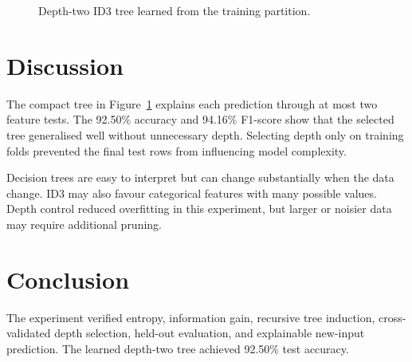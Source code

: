 \documentclass[12pt,a4paper]{report}
\begin{document}
\begin{figure}[H]\centering
{}
\caption{Depth-two ID3 tree learned from the training partition.}
\label{fig:tree}
\end{figure}

\section{Discussion}
The compact tree in Figure~\ref{fig:tree} explains each prediction through at most two feature tests. The 92.50\% accuracy and 94.16\% F1-score show that the selected tree generalised well without unnecessary depth. Selecting depth only on training folds prevented the final test rows from influencing model complexity.

Decision trees are easy to interpret but can change substantially when the data change. ID3 may also favour categorical features with many possible values. Depth control reduced overfitting in this experiment, but larger or noisier data may require additional pruning.

\section{Conclusion}
The experiment verified entropy, information gain, recursive tree induction, cross-validated depth selection, held-out evaluation, and explainable new-input prediction. The learned depth-two tree achieved 92.50\% test accuracy.
\end{document}
